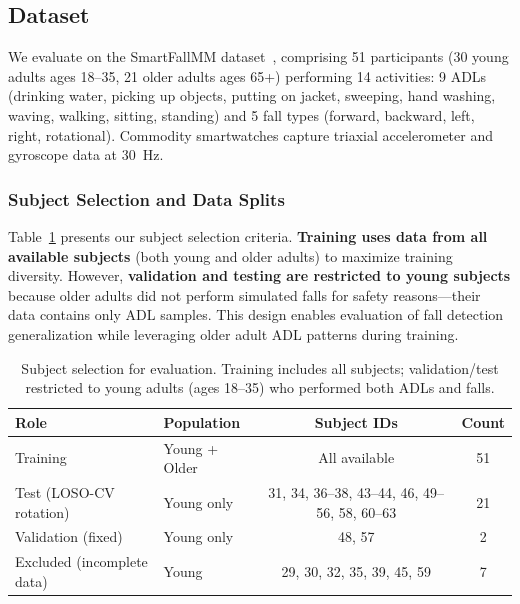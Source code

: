 
\subsection{Dataset}
\label{subsec:dataset}

We evaluate on the SmartFallMM dataset~\cite{ngu2022personalized}, comprising 51 participants (30 young adults ages 18--35, 21 older adults ages 65+) performing 14 activities: 9 ADLs (drinking water, picking up objects, putting on jacket, sweeping, hand washing, waving, walking, sitting, standing) and 5 fall types (forward, backward, left, right, rotational). Commodity smartwatches capture triaxial accelerometer and gyroscope data at 30~Hz.

\subsubsection{Subject Selection and Data Splits}

Table~\ref{tab:subjects} presents our subject selection criteria. \textbf{Training uses data from all available subjects} (both young and older adults) to maximize training diversity. However, \textbf{validation and testing are restricted to young subjects} because older adults did not perform simulated falls for safety reasons---their data contains only ADL samples. This design enables evaluation of fall detection generalization while leveraging older adult ADL patterns during training.

\begin{table}[H]
\caption{Subject selection for evaluation. Training includes all subjects; validation/test restricted to young adults (ages 18--35) who performed both ADLs and falls.}
\label{tab:subjects}
\centering
\small
\begin{tabular}{llcc}
\toprule
\textbf{Role} & \textbf{Population} & \textbf{Subject IDs} & \textbf{Count} \\
\midrule
Training & Young + Older & All available & 51 \\
Test (LOSO-CV rotation) & Young only & 31, 34, 36--38, 43--44, 46, 49--56, 58, 60--63 & 21 \\
Validation (fixed) & Young only & 48, 57 & 2 \\
Excluded (incomplete data) & Young & 29, 30, 32, 35, 39, 45, 59 & 7 \\
\bottomrule
\end{tabular}
\end{table}

